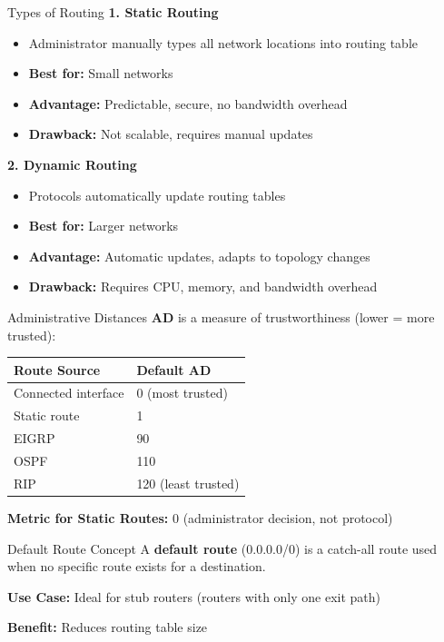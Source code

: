 \documentclass[12pt,a4paper]{article}
\begin{document}
\begin{theorybox}{Types of Routing}
\textbf{1. Static Routing}
\begin{itemize}[noitemsep]
    \item Administrator manually types all network locations into routing table
    \item \textbf{Best for:} Small networks
    \item \textbf{Advantage:} Predictable, secure, no bandwidth overhead
    \item \textbf{Drawback:} Not scalable, requires manual updates
\end{itemize}

\vspace{0.2cm}
\textbf{2. Dynamic Routing}
\begin{itemize}[noitemsep]
    \item Protocols automatically update routing tables
    \item \textbf{Best for:} Larger networks
    \item \textbf{Advantage:} Automatic updates, adapts to topology changes
    \item \textbf{Drawback:} Requires CPU, memory, and bandwidth overhead
\end{itemize}
\end{theorybox}

\begin{theorybox}{Administrative Distances}
\textbf{AD} is a measure of trustworthiness (lower = more trusted):

\begin{center}
\begin{tabular}{ll}
\toprule
\textbf{Route Source} & \textbf{Default AD} \\
\midrule
Connected interface & 0 (most trusted) \\
Static route & 1 \\
EIGRP & 90 \\
OSPF & 110 \\
RIP & 120 (least trusted) \\
\bottomrule
\end{tabular}
\end{center}

\textbf{Metric for Static Routes:} 0 (administrator decision, not protocol)
\end{theorybox}

\begin{theorybox}{Default Route Concept}
A \textbf{default route} (0.0.0.0/0) is a catch-all route used when no specific route exists for a destination.

\vspace{0.2cm}
\textbf{Use Case:} Ideal for stub routers (routers with only one exit path)

\vspace{0.2cm}
\textbf{Benefit:} Reduces routing table size
\end{theorybox}
\end{document}
